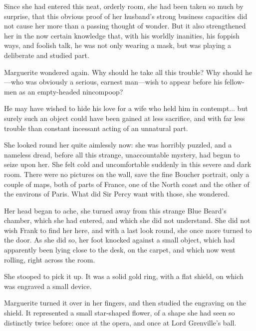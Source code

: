 Since she had entered this neat, orderly room, she had been taken so much by surprise, that this obvious proof of her husband's strong business capacities did not cause her more than a passing thought of wonder. But it also strengthened her in the now certain knowledge that, with his worldly inanities, his foppish ways, and foolish talk, he was not only wearing a mask, but was playing a deliberate and studied part.

Marguerite wondered again. Why should he take all this trouble? Why should he---who was obviously a serious, earnest man---wish to appear before his fellow-men as an empty-headed nincompoop?

He may have wished to hide his love for a wife who held him in contempt... but surely such an object could have been gained at less sacrifice, and with far less trouble than constant incessant acting of an unnatural part.

She looked round her quite aimlessly now: she was horribly puzzled, and a nameless dread, before all this strange, unaccountable mystery, had begun to seize upon her. She felt cold and uncomfortable suddenly in this severe and dark room. There were no pictures on the wall, save the fine Boucher portrait, only a couple of maps, both of parts of France, one of the North coast and the other of the environs of Paris. What did Sir Percy want with those, she wondered.

Her head began to ache, she turned away from this strange Blue Beard's chamber, which she had entered, and which she did not understand. She did not wish Frank to find her here, and with a last look round, she once more turned to the door. As she did so, her foot knocked against a small object, which had apparently been lying close to the desk, on the carpet, and which now went rolling, right across the room.

She stooped to pick it up. It was a solid gold ring, with a flat shield, on which was engraved a small device.

Marguerite turned it over in her fingers, and then studied the engraving on the shield. It represented a small star-shaped flower, of a shape she had seen so distinctly twice before: once at the opera, and once at Lord Grenville's ball.